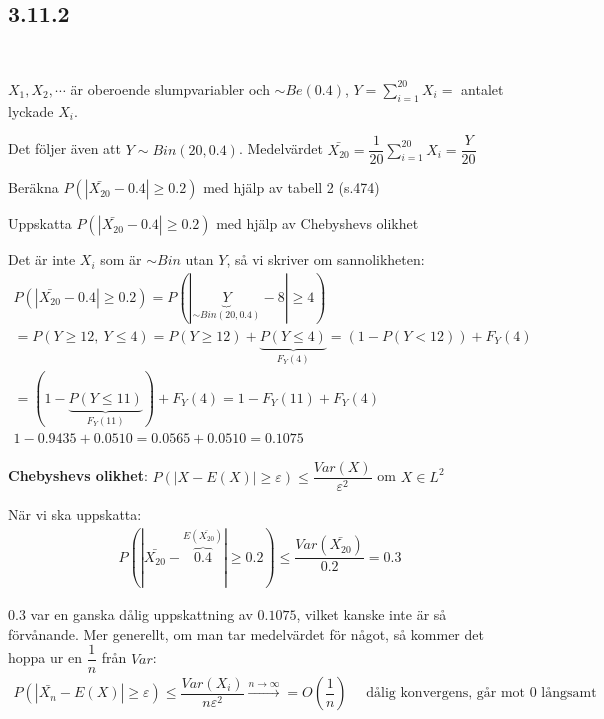 \subsection{3.11.2}\hfill\\\par
\noindent $X_1,X_2,\cdots$ är oberoende slumpvariabler och $\sim Be(0.4)$, $Y = \sum_{i=1}^{20}X_i=$ antalet lyckade $X_i$.\par
\noindent Det följer även att $Y\sim Bin(20,0.4)$. Medelvärdet $\bar{X_{20}} = \dfrac{1}{20}\sum_{i=1}^{20}X_i = \dfrac{Y}{20}$
\par\bigskip
\noindent Beräkna $P(\left|\bar{X_{20}}-0.4\right|\geq0.2)$ med hjälp av tabell 2 (s.474)\par
\noindent Uppskatta $P(\left|\bar{X_{20}}-0.4\right|\geq0.2)$ med hjälp av Chebyshevs olikhet
\par\bigskip
\noindent Det är inte $X_i$ som är $\sim Bin$ utan $Y$, så vi skriver om sannolikheten:
\begin{equation*}
  \begin{gathered}
    P(\left|\bar{X_{20}}-0.4\right|\geq0.2) = P(\left|\underbrace{Y}_{\text{$\sim Bin(20,0.4)$}}-8\right|\geq4)\\
    =P(Y\geq12,\: Y\leq4) = P(Y\geq12)+\underbrace{P(Y\leq4)}_{\text{$F_Y(4)$}} = (1-P(Y<12))+F_Y(4)\\
    = (1-\underbrace{P(Y\leq11)}_{\text{$F_Y(11)$}})+F_Y(4) = 1-F_Y(11)+F_Y(4)\\
    1-0.9435+0.0510=0.0565+0.0510=0.1075
  \end{gathered}
\end{equation*}
\par\bigskip
\noindent\textbf{Chebyshevs olikhet}: $P(\left|X-E(X)\right|\geq\varepsilon)\leq\dfrac{Var(X)}{\varepsilon^2}$ om $X\in L^2$
\par\bigskip
\noindent När vi ska uppskatta:
\begin{equation*}
  \begin{gathered}
    P(\left|\bar{X_{20}}-\overbrace{0.4}^{\text{$E(\bar{X_{20}})$}}\right|\geq0.2)\leq\dfrac{Var(\bar{X_{20}})}{0.2} = 0.3
  \end{gathered}
\end{equation*}
\par\bigskip
\noindent  $0.3$ var en ganska dålig uppskattning av $0.1075$, vilket kanske inte är så förvånande. Mer generellt, om man tar medelvärdet för något, så kommer det hoppa ur en $\dfrac{1}{n}$ från $Var$:
\begin{equation*}
  \begin{gathered}
    P(\left|\bar{X_n}-E(X)\right|\geq\varepsilon) \leq \dfrac{Var(X_i)}{n\varepsilon^2}\stackrel{n\to\infty}{\rightarrow} = O\left(\dfrac{1}{n}\right)\quad\text{ dålig konvergens, går mot 0 långsamt}
  \end{gathered}
\end{equation*}
